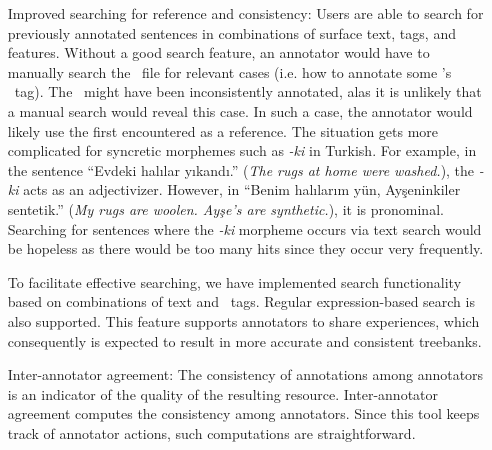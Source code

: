 \begin{itemize}[before=\normalfont, font=\itshape, align=left,noitemsep,topsep=0pt,parsep=0pt,partopsep=0pt,labelsep=3pt,align=left]
    \item[Improved searching for reference and consistency:]
        Users are able to search for previously annotated sentences in combinations of surface text, tags, and features.
		Without a good search feature, an annotator would have to manually search the \conllu\ file for relevant cases (i.e. how to annotate some \form's \upos\ tag).
		The \form\ might have been inconsistently annotated, alas it is unlikely that a manual search would reveal this case.
		In such a case, the annotator would likely use the first encountered as a reference.
        The situation gets more complicated for syncretic morphemes such as \textit{-ki} in Turkish.
        For example, in the sentence ``Evdeki halılar yıkandı.'' (\textit{The rugs at home were washed.}), the \textit{-ki} acts as an adjectivizer.
        However, in ``Benim halılarım yün, Ayşeninkiler sentetik.'' (\textit{My rugs are woolen. Ayşe's are synthetic.}), it is pronominal.
        Searching for sentences where the \textit{-ki} morpheme occurs via text search would be hopeless as there would be too many hits since they occur very frequently.

        To facilitate effective searching, we have implemented search functionality based on combinations of text and \ud\ tags.
        Regular expression-based search is also supported.
        This feature supports annotators to share experiences, which consequently is expected to result in more accurate and consistent treebanks.

    \item[Inter-annotator agreement:]
        The consistency of annotations among annotators is an indicator of the quality of the resulting resource.
        Inter-annotator agreement computes the consistency among annotators.
        Since this tool keeps track of annotator actions, such computations are straightforward.

\end{itemize}
